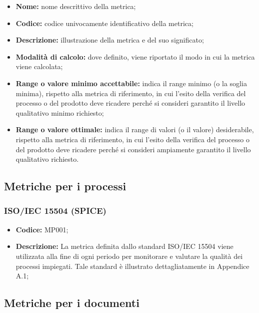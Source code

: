 \documentclass[../NormediProgetto.tex]{subfiles}
\begin{document}
\begin{itemize}
	\item \textbf{Nome:} nome descrittivo della metrica;
	
	\item \textbf{Codice:} codice univocamente identificativo della metrica;
	
	\item \textbf{Descrizione:} illustrazione della metrica e del suo significato; 
	
	\item \textbf{Modalità di calcolo:} dove definito, viene riportato il modo in cui la metrica viene calcolata;
	
	\item \textbf{Range o valore minimo accettabile:} indica il range minimo (o la soglia minima), rispetto alla metrica di riferimento, in cui l'esito della verifica del processo o del prodotto deve ricadere perché si consideri garantito il livello qualitativo minimo richiesto;
	
	\item \textbf{Range o valore ottimale:} indica il range di valori (o il valore) desiderabile, rispetto alla metrica di riferimento, in cui l'esito della verifica del processo o del prodotto deve ricadere perché si consideri ampiamente garantito il livello qualitativo richiesto.
\end{itemize}



\subsection{Metriche per i processi}

\subsubsection{ISO/IEC 15504 (SPICE)}

\begin{itemize}
	\item \textbf{Codice:} MP001;
	\item \textbf{Descrizione:} La metrica definita dallo standard ISO/IEC 15504 viene utilizzata alla fine di ogni periodo per monitorare e valutare la qualità dei processi impiegati. Tale standard è illustrato dettagliatamente in Appendice A.1;
\end{itemize}


\subsection{Metriche per i documenti}
\end{document}
